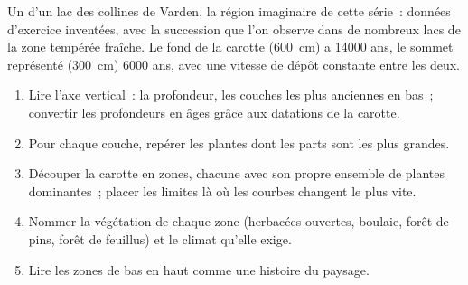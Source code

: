 \begin{omfigure}

{\small Un  d'un lac des collines de Varden, la région
imaginaire de cette série~: données d'exercice inventées, avec la
succession que l'on observe dans de nombreux lacs de la zone tempérée
fraîche. Le fond de la carotte (\qty{600}{cm}) a \num{14000} ans, le
sommet représenté (\qty{300}{cm}) \num{6000} ans, avec une vitesse de dépôt
constante entre les deux.}
\end{omfigure}

\begin{method}
\begin{enumerate}
  \item Lire l'axe vertical~: la profondeur, les couches les plus anciennes
        en bas~; convertir les profondeurs en âges grâce aux datations de
        la carotte.
  \item Pour chaque couche, repérer les plantes dont les parts sont les
        plus grandes.
  \item Découper la carotte en zones, chacune avec son propre ensemble de
        plantes dominantes~; placer les limites là où les courbes changent
        le plus vite.
  \item Nommer la végétation de chaque zone (herbacées ouvertes, boulaie,
        forêt de pins, forêt de feuillus) et le climat qu'elle exige.
  \item Lire les zones de bas en haut comme une histoire du paysage.
\end{enumerate}
\end{method}

